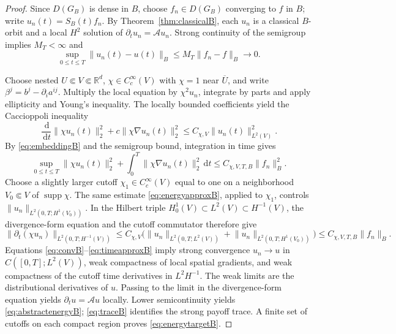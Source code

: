 \documentclass[11pt,a4paper]{article}
\theoremstyle{definition}\newtheorem{definition}{Definition}[section]\newtheorem{example}[theorem]{Example}
\theoremstyle{remark}\newtheorem{remark}[theorem]{Remark}\newtheorem{remarkSix}{Remark}[section]
\newcommand{\Rd}{\mathbb R^d}
\newcommand{\Cc}{C_c^\infty}
\newcommand{\dd}{\,\mathrm d}
\newcommand{\norm}[1]{\lVert #1\rVert}
\newcommand{\supp}{\operatorname{supp}}
\newcommand{\cA}{\mathcal A}
\begin{document}
\begin{proof}
Since $D(G_B)$ is dense in $B$, choose $f_n\in D(G_B)$ converging to $f$ in $B$; write $u_n(t)=S_B(t)f_n$. By Theorem~\ref{thm:classicalB}, each $u_n$ is a classical $B$-orbit and a local $H^2$ solution of $\partial_tu_n=\cA u_n$. Strong continuity of the semigroup implies $M_T<\infty$ and
\begin{equation}\label{eq:convB}
 \sup_{0\le t\le T}\norm{u_n(t)-u(t)}_B
 \le M_T\norm{f_n-f}_B\longrightarrow0.
\end{equation}

Choose nested $U\Subset V\Subset\Rd$, $\chi\in\Cc(V)$ with $\chi=1$ near $\overline U$, and write $\beta^j=b^j-\partial_i a^{ij}$. Multiply the local equation by $\chi^2u_n$, integrate by parts and apply ellipticity and Young's inequality. The locally bounded coefficients yield the Caccioppoli inequality
\begin{equation}\label{eq:CacciB}
 \frac{\dd}{\dd t}\norm{\chi u_n(t)}_2^2
 +c\norm{\chi\nabla u_n(t)}_2^2
 \le C_{\chi,V}\norm{u_n(t)}_{L^2(V)}^2.
\end{equation}
By \eqref{eq:embeddingB} and the semigroup bound, integration in time gives
\begin{equation}\label{eq:energyapproxB}
 \sup_{0\le t\le T}\norm{\chi u_n(t)}_2^2
 +\int_0^T\norm{\chi\nabla u_n(t)}_2^2\dd t
 \le C_{\chi,V,T,B}\norm{f_n}_B^2.
\end{equation}
Choose a slightly larger cutoff $\chi_1\in\Cc(V)$ equal to one on a neighborhood $V_0\Subset V$ of $\supp\chi$. The same estimate \eqref{eq:energyapproxB}, applied to $\chi_1$, controls $\norm{u_n}_{L^2(0,T;H^1(V_0))}$. In the Hilbert triple $H_0^1(V)\subset L^2(V)\subset H^{-1}(V)$, the divergence-form equation and the cutoff commutator therefore give
\begin{equation}\label{eq:timeapproxB}
 \norm{\partial_t(\chi u_n)}_{L^2(0,T;H^{-1}(V))}
 \le C_{\chi,V}\bigl(\norm{u_n}_{L^2(0,T;L^2(V))}
 +\norm{u_n}_{L^2(0,T;H^1(V_0))}\bigr)
 \le C_{\chi,V,T,B}\norm{f_n}_B.
\end{equation}
Equations \eqref{eq:convB}--\eqref{eq:timeapproxB} imply strong convergence $u_n\to u$ in $C([0,T];L^2(V))$, weak compactness of local spatial gradients, and weak compactness of the cutoff time derivatives in $L^2H^{-1}$. The weak limits are the distributional derivatives of $u$. Passing to the limit in the divergence-form equation yields $\partial_tu=\cA u$ locally. Lower semicontinuity yields \eqref{eq:abstractenergyB}; \eqref{eq:traceB} identifies the strong payoff trace. A finite set of cutoffs on each compact region proves \eqref{eq:energytargetB}.
\end{proof}
\end{document}
